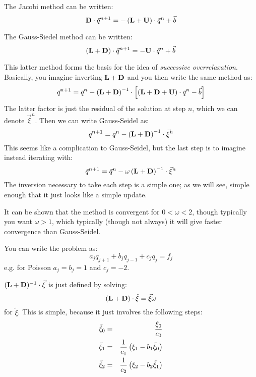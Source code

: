 The Jacobi method can be written:
\begin{equation}
{\bf D}\cdot\vec{q}^{n+1} = - \left({\bf L}
+ {\bf U}\right) \cdot \vec{q}^n + \vec{b}
\end{equation}

The Gauss-Siedel method can be written:
\begin{equation}
\left({\bf L} + {\bf D}\right)\cdot\vec{q}^{n+1}
= - {\bf U}\cdot \vec{q}^n + \vec{b}
\end{equation}

This latter method forms the basis for the idea of {\it successive
overrelaxation}. Basically, you imagine inverting ${\bf L}+{\bf D}$
and you then write the same method as:
\begin{equation}
\vec{q}^{n+1} = \vec{q}^n
- \left({\bf L}+{\bf D}\right)^{-1}\cdot \left[
\left({\bf L}+{\bf D}+{\bf U}\right)\cdot\vec{q}^n - \vec{b}\right]
\end{equation}
The latter factor is just the residual of the solution at step $n$,
which we can denote $\vec{\xi}^n$. Then we can write Gauss-Seidel as:
\begin{equation}
\vec{q}^{n+1} = \vec{q}^n
- \left({\bf L}+{\bf D}\right)^{-1}\cdot \vec{\xi}^n
\end{equation}
This seems like a complication to Gauss-Seidel, but the last step is
to imagine instead iterating with:
\begin{equation}
\vec{q}^{n+1} = \vec{q}^n - \omega
\left({\bf L}+{\bf D}\right)^{-1}\cdot \vec{\xi}^n
\end{equation}
The inversion necessary to take each step is a simple one; as we will
see, simple enough that it just looks like a simple update.

It can be shown that the method is convergent for $0<\omega<2$, though
typically you want $\omega>1$, which typically (though not always) it
will give faster convergence than Gauss-Seidel.
 
You can write the problem as:
\begin{equation}
a_j q_{j+1} + b_j q_{j-1} + c_j q_j = f_j
\end{equation}
e.g. for Poisson $a_j=b_j =1$ and $c_j=-2$. 

$({\bf L}+{\bf D})^{-1} \cdot \vec{\xi}$ is just defined by solving:
\begin{equation}
({\bf L} + {\bf D}) \cdot \tilde\xi = \vec{\xi} \omega
\end{equation}
for $\tilde\xi$. This is simple, because it just
involves the following steps:
\begin{eqnarray}
\tilde\xi_0 &=& \frac{\xi_0}{c_0} \cr
\tilde\xi_1 &=& \frac{1}{c_1} \left(\xi_1 - b_1 \tilde\xi_0\right)\cr
\tilde\xi_2 &=& \frac{1}{c_2} \left(\xi_2 - b_2 \tilde\xi_1\right)
\end{eqnarray}


